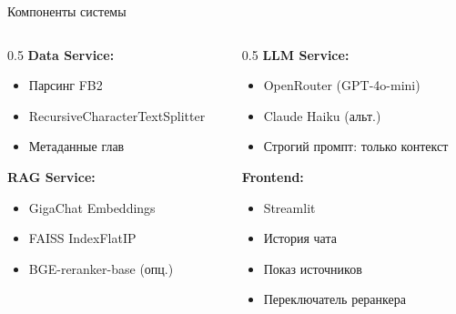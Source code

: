 \documentclass[aspectratio=169,12pt]{beamer}
\begin{document}
\begin{frame}{Компоненты системы}

\begin{columns}
\begin{column}{0.5\textwidth}
\textbf{Data Service:}
\begin{itemize}
    \item Парсинг FB2
    \item RecursiveCharacterTextSplitter
    \item Метаданные глав
\end{itemize}

\vspace{0.5em}
\textbf{RAG Service:}
\begin{itemize}
    \item GigaChat Embeddings
    \item FAISS IndexFlatIP
    \item BGE-reranker-base (опц.)
\end{itemize}
\end{column}

\begin{column}{0.5\textwidth}
\textbf{LLM Service:}
\begin{itemize}
    \item OpenRouter (GPT-4o-mini)
    \item Claude Haiku (альт.)
    \item Строгий промпт: только контекст
\end{itemize}

\vspace{0.5em}
\textbf{Frontend:}
\begin{itemize}
    \item Streamlit
    \item История чата
    \item Показ источников
    \item Переключатель реранкера
\end{itemize}
\end{column}
\end{columns}

\end{frame}
\end{document}
